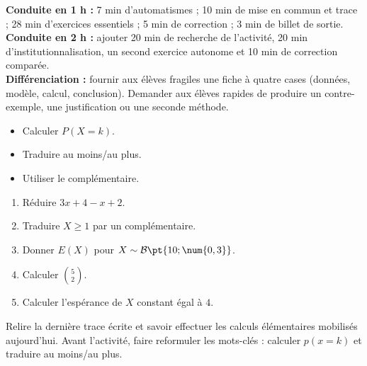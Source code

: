 \ifmxteacher
\begin{method}
\textbf{Conduite en 1 h :} 7 min d'automatismes ; 10 min de mise en commun et trace ; 28 min d'exercices essentiels ; 5 min de correction ; 3 min de billet de sortie.\\
\textbf{Conduite en 2 h :} ajouter 20 min de recherche de l'activité, 20 min d'institutionnalisation, un second exercice autonome et 10 min de correction comparée.\\
\textbf{Différenciation :} fournir aux élèves fragiles une fiche à quatre cases (données, modèle, calcul, conclusion). Demander aux élèves rapides de produire un contre-exemple, une justification ou une seconde méthode.
\end{method}
\fi
{}
\begin{objectives}\begin{itemize}\item Calculer $P(X=k)$.\item Traduire au moins/au plus.\item Utiliser le complémentaire.\end{itemize}\end{objectives}
\begin{fluency}\begin{enumerate}\item Réduire $3x+4-x+2$. \item Traduire $X\geq1$ par un complémentaire. \item Donner $E(X)$ pour $X\sim\mathcal B\pt{10;\num{0,3}}$. \item Calculer $\binom52$. \item Calculer l'espérance de $X$ constant égal à $4$. \end{enumerate}\end{fluency}
\begin{prerequisites}Relire la dernière trace écrite et savoir effectuer les calculs élémentaires mobilisés aujourd'hui. Avant l'activité, faire reformuler les mots-clés : calculer $p(x=k)$ et traduire au moins/au plus.\end{prerequisites}

